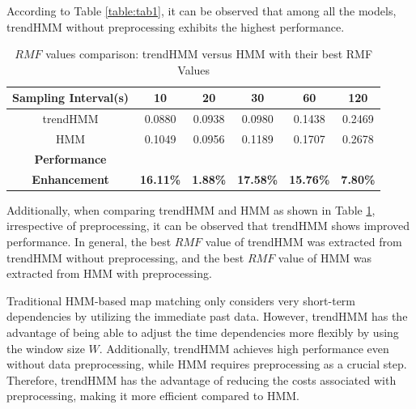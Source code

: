 \documentclass[preprint,12pt]{elsarticle}
\begin{document}
According to Table \ref{table:tab1}, it can be observed that among all the models, trendHMM without preprocessing exhibits the highest performance.
\begin{table}[bp]
	\centering
	\begin{tabular}{|c|c c c c c|}
		\hline
		\textbf{Sampling Interval(s)} & \textbf{10} & \textbf{20} & \textbf{30} & \textbf{60} & \textbf{120} \\ 
		\hline\hline
		trendHMM & {0.0880} & {0.0938} & {0.0980} & {0.1438} & {0.2469} \\ 
		\hline
		HMM & {0.1049} & {0.0956} & {0.1189} & {0.1707}  & {0.2678} \\ 
		\hline
		\textbf{Performance } &  & & & & \\
		\textbf{Enhancement} & \textbf{16.11\%} & \textbf{1.88\%} & \textbf{17.58\%} & \textbf{15.76\%}  &
		 \textbf{7.80\%} \\ 
		\hline
	\end{tabular}
	\caption{$RMF$ values comparison: trendHMM versus HMM with their best RMF Values }
	\label{table:tab2}
\end{table}
Additionally, when comparing trendHMM and HMM as shown in Table \ref{table:tab2}, irrespective of preprocessing, it can be observed that trendHMM shows improved performance. In general, the best $RMF$ value of trendHMM was extracted from trendHMM without preprocessing, and the best $RMF$ value of HMM was extracted from HMM with preprocessing.

Traditional HMM-based map matching only considers very short-term dependencies by utilizing the immediate past data. However, trendHMM has the advantage of being able to adjust the time dependencies more flexibly by using the window size $W$. Additionally, trendHMM achieves high performance even without data preprocessing, while HMM requires preprocessing as a crucial step. Therefore, trendHMM has the advantage of reducing the costs associated with preprocessing, making it more efficient compared to HMM.
\end{document}
